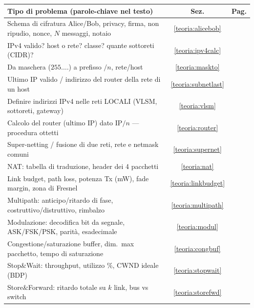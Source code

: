 \documentclass[11pt,a4paper]{report}
\begin{document}
\renewcommand{\arraystretch}{1.15}
\small
\begin{center}
\begin{tabular}{|p{8.4cm}|c|c|}
\hline
\textbf{Tipo di problema (parole-chiave nel testo)} & \textbf{Sez.} & \textbf{Pag.} \\ \hline
Schema di cifratura Alice/Bob, privacy, firma, non ripudio, nonce, $N$ messaggi, notaio & \ref{teoria:alicebob} & \pageref{teoria:alicebob} \\ \hline
IPv4 valido? host o rete? classe? quante sottoreti (CIDR)? & \ref{teoria:ipv4calc} & \pageref{teoria:ipv4calc} \\ \hline
Da maschera ($255.\dots$) a prefisso $/n$, rete/host & \ref{teoria:maskto} & \pageref{teoria:maskto} \\ \hline
Ultimo IP valido / indirizzo del router della rete di un host & \ref{teoria:subnetlast} & \pageref{teoria:subnetlast} \\ \hline
Definire indirizzi IPv4 nelle reti LOCALI (VLSM, sottoreti, gateway) & \ref{teoria:vlsm} & \pageref{teoria:vlsm} \\ \hline
Calcolo del router (ultimo IP) dato IP$/n$ --- procedura ottetti & \ref{teoria:router} & \pageref{teoria:router} \\ \hline
Super-netting / fusione di due reti, rete e netmask comuni & \ref{teoria:supernet} & \pageref{teoria:supernet} \\ \hline
NAT: tabella di traduzione, header dei 4 pacchetti & \ref{teoria:nat} & \pageref{teoria:nat} \\ \hline
Link budget, path loss, potenza Tx (mW), fade margin, zona di Fresnel & \ref{teoria:linkbudget} & \pageref{teoria:linkbudget} \\ \hline
Multipath: anticipo/ritardo di fase, costruttivo/distruttivo, rimbalzo & \ref{teoria:multipath} & \pageref{teoria:multipath} \\ \hline
Modulazione: decodifica bit da segnale, ASK/FSK/PSK, parità, esadecimale & \ref{teoria:modul} & \pageref{teoria:modul} \\ \hline
Congestione/saturazione buffer, dim.\ max pacchetto, tempo di saturazione & \ref{teoria:congbuf} & \pageref{teoria:congbuf} \\ \hline
Stop\&Wait: throughput, utilizzo \%, CWND ideale (BDP) & \ref{teoria:stopwait} & \pageref{teoria:stopwait} \\ \hline
Store\&Forward: ritardo totale su $k$ link, bus vs switch & \ref{teoria:storefwd} & \pageref{teoria:storefwd} \\ \hline

\end{tabular}
\end{center}
\end{document}
